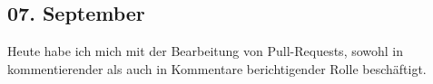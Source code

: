 \subsection{07. September}
Heute habe ich mich mit der Bearbeitung von Pull-Requests, sowohl in kommentierender als auch in Kommentare berichtigender Rolle beschäftigt. 